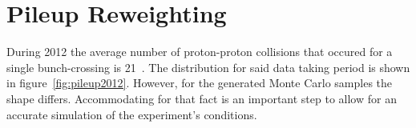 
\section{Pileup Reweighting}
\label{sec:pileup}

During 2012 the average number of proton-proton collisions that occured for a single bunch-crossing is 21~\cite{cmslumi}. The distribution for said data taking period is shown in figure~\ref{fig:pileup2012}. However, for the generated Monte Carlo samples the shape differs. Accommodating for that fact is an important step to allow for an accurate simulation of the experiment's conditions.

